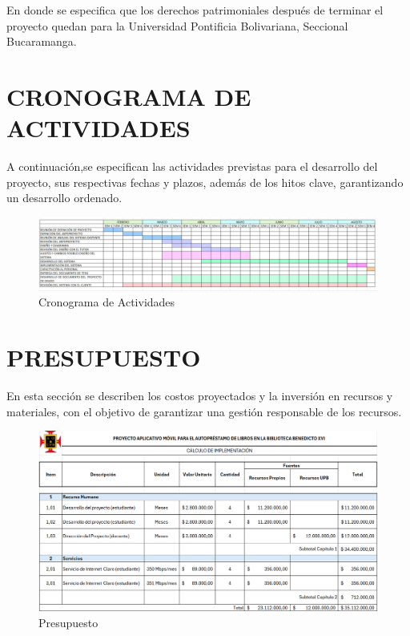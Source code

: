 \documentclass[spanish]{ieee_upb}
\begin{document}
En donde se especifica que los derechos patrimoniales después de terminar el proyecto quedan para la Universidad Pontificia Bolivariana, Seccional Bucaramanga.

\newpage
\section{CRONOGRAMA DE ACTIVIDADES}
A continuación,se especifican las actividades previstas para el desarrollo del proyecto, sus respectivas fechas y plazos, además de los hitos clave, garantizando un desarrollo ordenado.

\begin{figure}[htpb]
    \centering
    \includegraphics[width=1\linewidth]{img/cronograma.png}
    \caption[Cronograma de Actividades]{Cronograma de Actividades}
    \label{fig:cronograma}
\end{figure}

\newpage
\section{PRESUPUESTO}
En esta sección se describen los costos proyectados y la inversión en recursos y materiales, con el objetivo de garantizar una gestión responsable de los recursos.

\begin{figure}[htpb]
    \centering
    \includegraphics[width=1\linewidth]{img/p.png}
    \caption[Presupuesto]{Presupuesto}
    \label{fig:presupuesto}
\end{figure}
\end{document}
